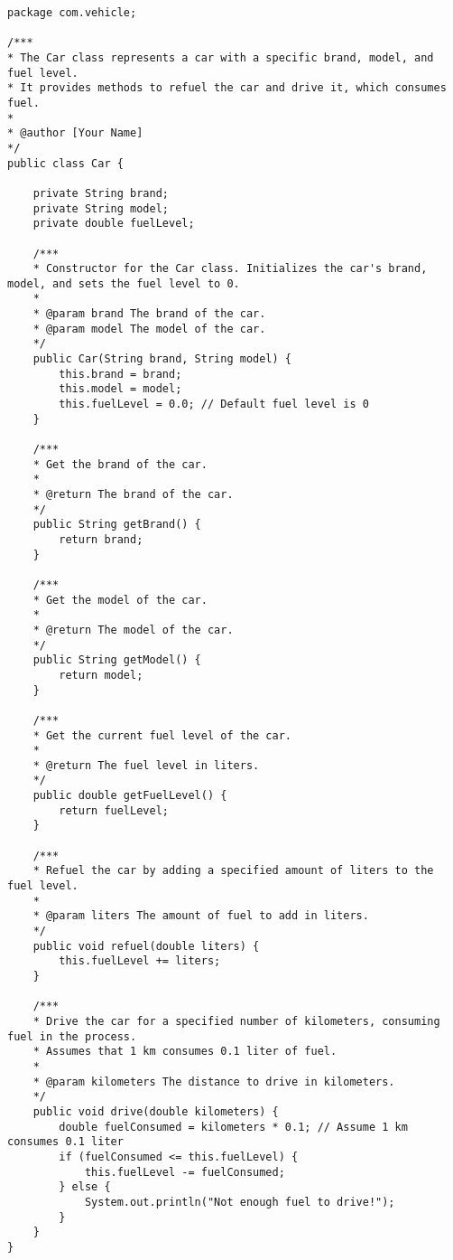 \begin{lstlisting}[style=JavaStyle, caption={Kode Java: Car.java}]
package com.vehicle;

/***
* The Car class represents a car with a specific brand, model, and fuel level.
* It provides methods to refuel the car and drive it, which consumes fuel.
* 
* @author [Your Name]
*/
public class Car {
	
	private String brand;
	private String model;
	private double fuelLevel;
	
	/***
	* Constructor for the Car class. Initializes the car's brand, model, and sets the fuel level to 0.
	* 
	* @param brand The brand of the car.
	* @param model The model of the car.
	*/
	public Car(String brand, String model) {
		this.brand = brand;
		this.model = model;
		this.fuelLevel = 0.0; // Default fuel level is 0
	}
	
	/***
	* Get the brand of the car.
	* 
	* @return The brand of the car.
	*/
	public String getBrand() {
		return brand;
	}
	
	/***
	* Get the model of the car.
	* 
	* @return The model of the car.
	*/
	public String getModel() {
		return model;
	}
	
	/***
	* Get the current fuel level of the car.
	* 
	* @return The fuel level in liters.
	*/
	public double getFuelLevel() {
		return fuelLevel;
	}
	
	/***
	* Refuel the car by adding a specified amount of liters to the fuel level.
	* 
	* @param liters The amount of fuel to add in liters.
	*/
	public void refuel(double liters) {
		this.fuelLevel += liters;
	}
	
	/***
	* Drive the car for a specified number of kilometers, consuming fuel in the process.
	* Assumes that 1 km consumes 0.1 liter of fuel.
	* 
	* @param kilometers The distance to drive in kilometers.
	*/
	public void drive(double kilometers) {
		double fuelConsumed = kilometers * 0.1; // Assume 1 km consumes 0.1 liter
		if (fuelConsumed <= this.fuelLevel) {
			this.fuelLevel -= fuelConsumed;
		} else {
			System.out.println("Not enough fuel to drive!");
		}
	}
}
\end{lstlisting}

